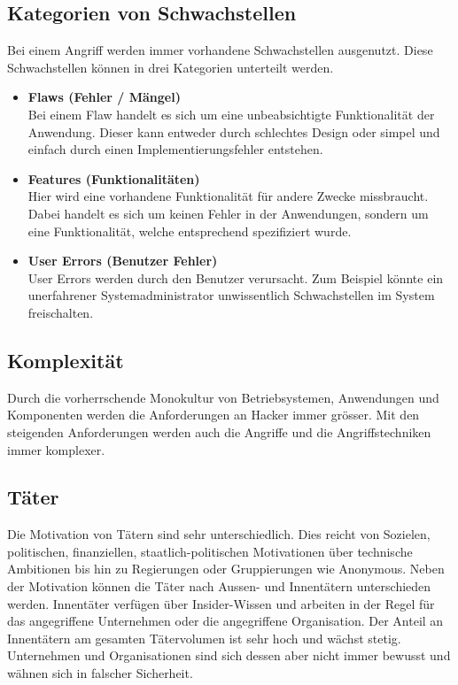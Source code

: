 \subsection{Kategorien von Schwachstellen}
Bei einem Angriff werden immer vorhandene Schwachstellen ausgenutzt. Diese Schwachstellen können in drei Kategorien unterteilt werden.

\begin{itemize}
\item \textbf{Flaws (Fehler / Mängel)} \\
Bei einem Flaw handelt es sich um eine unbeabsichtigte Funktionalität der Anwendung. Dieser kann entweder durch schlechtes Design oder simpel und einfach durch einen Implementierungsfehler entstehen.
\item \textbf{Features (Funktionalitäten)} \\
Hier wird eine vorhandene Funktionalität für andere Zwecke missbraucht. Dabei handelt es sich um keinen Fehler in der Anwendungen, sondern um eine Funktionalität, welche entsprechend spezifiziert wurde.
\item \textbf{User Errors (Benutzer Fehler)} \\
User Errors werden durch den Benutzer verursacht. Zum Beispiel könnte ein unerfahrener Systemadministrator unwissentlich Schwachstellen im System freischalten.
\end{itemize}


\subsection{Komplexität}
Durch die vorherrschende Monokultur von Betriebsystemen, Anwendungen und Komponenten werden die Anforderungen an Hacker immer grösser. Mit den steigenden Anforderungen werden auch die Angriffe und die Angriffstechniken immer komplexer.



\subsection{Täter}
Die Motivation von Tätern sind sehr unterschiedlich. Dies reicht von Sozielen, politischen, finanziellen, staatlich-politischen Motivationen über technische Ambitionen bis hin zu Regierungen oder Gruppierungen wie Anonymous. Neben der Motivation können die Täter nach Aussen- und Innentätern unterschieden werden. Innentäter verfügen über Insider-Wissen und arbeiten in der Regel für das angegriffene Unternehmen oder die angegriffene Organisation. Der Anteil an Innentätern am gesamten Tätervolumen ist sehr hoch und wächst stetig. Unternehmen und Organisationen sind sich dessen aber nicht immer bewusst und wähnen sich in falscher Sicherheit.

